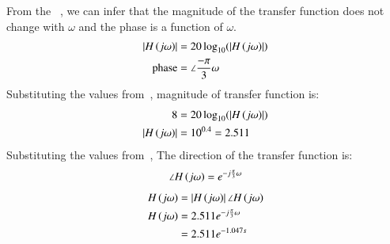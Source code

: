 \documentclass[journal,12pt,twocolumn]{IEEEtran}
\theoremstyle{remark}
\begin{document}
    \solution
    From the ~, we can infer that the magnitude of the transfer function does not change with $\omega$ and the phase is a function of $\omega$.
    \begin{align}
        \left\vert{H}\left(j\omega\right)\right\vert&= 20\log_{10}(\left\vert{H}\left(j\omega\right)\right\vert) \\
        \text{phase} &= \angle \frac{-\pi}{3}\omega
    \end{align}
    Substituting the values from~, magnitude of transfer function is:
    \begin{align}
        8 &= 20\log_{10}(\left\vert{H}\left(j\omega\right)\right\vert)\\
        \left\vert{H}\left(j\omega\right)\right\vert &= 10^{0.4} = 2.511
    \end{align}
    Substituting the values from~, The direction of the transfer function is:
    \begin{align}
        \angle H\left(j\omega\right) = e^{-j\frac{\pi}{3}\omega}
    \end{align}
    \begin{align}
        H\left(j\omega\right) &= \left\vert H\left(j\omega\right)\right\vert\angle H\left(j\omega\right)\\
        H\left(j\omega\right) &= 2.511 e^{-j\frac{\pi}{3}\omega} \\
        &= 2.511 e^{-1.047s}
    \end{align}
    \setcounter{figure}{1} %
\end{document}
